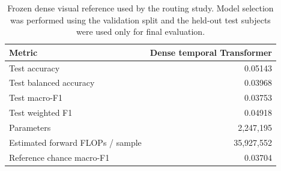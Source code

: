 
\begin{table}[t]
\centering
\caption{Frozen dense visual reference used by the routing study. Model
selection was performed using the validation split and the held-out test
subjects were used only for final evaluation.}
\label{tab:vision_baselines}
\begin{tabular}{lr}
\toprule
Metric & Dense temporal Transformer\\
\midrule
Test accuracy & 0.05143\\
Test balanced accuracy & 0.03968\\
Test macro-F1 & 0.03753\\
Test weighted F1 & 0.04918\\
Parameters & 2,247,195\\
Estimated forward FLOPs / sample & 35,927,552\\
Reference chance macro-F1 & 0.03704\\
\bottomrule
\end{tabular}
\end{table}
